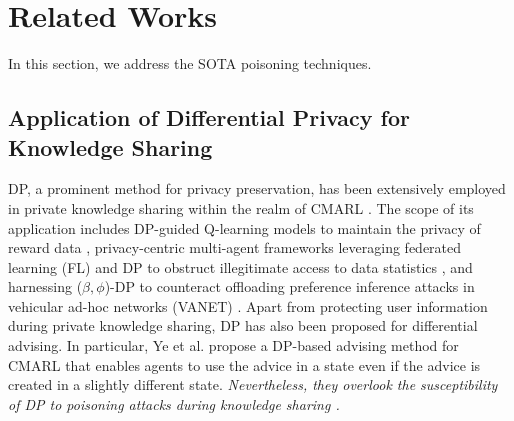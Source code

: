 \section{Related Works} \label{s:litReview}
In this section, we address the SOTA poisoning techniques.
\subsection{Application of Differential Privacy for Knowledge Sharing}

DP, a prominent method for privacy preservation, has been extensively employed in private knowledge sharing within the realm of CMARL \cite{ye2022differential,wang2019privacy,li2022privacy, Wei2022, Abahussein2023,ye2022one}. The scope of its application includes DP-guided Q-learning models to maintain the privacy of reward data \cite{wang2019privacy}, privacy-centric multi-agent frameworks leveraging federated learning (FL) and DP to obstruct illegitimate access to data statistics \cite{li2022privacy}, and harnessing ($\beta, \phi$)-DP to counteract offloading preference inference attacks in vehicular ad-hoc networks (VANET) \cite{Wei2022}. Apart from protecting user information during private knowledge sharing, DP has also been proposed for differential advising. In particular, Ye et al. \cite{ye2022differential} propose a DP-based advising method for CMARL that enables agents to use the advice in a state even if the advice is created in a slightly different state. \textit{Nevertheless, they overlook the susceptibility of DP to poisoning attacks during knowledge sharing \cite{ye2022differential, Abahussein2023,ye2022one}.}

